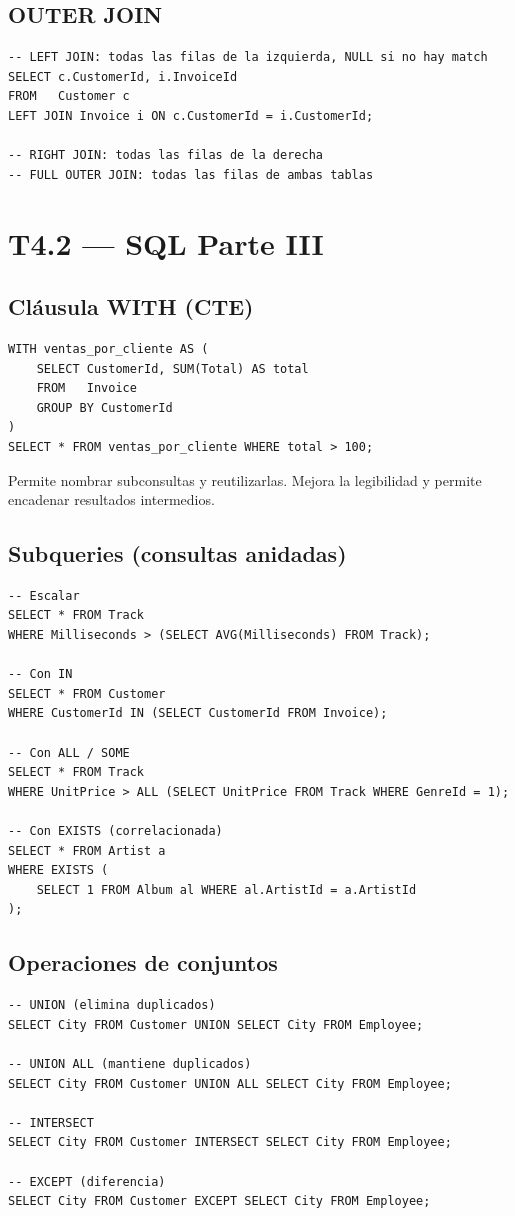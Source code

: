 \documentclass[12pt, a4paper]{article}
\begin{document}
\subsection{OUTER JOIN}
\begin{lstlisting}
-- LEFT JOIN: todas las filas de la izquierda, NULL si no hay match
SELECT c.CustomerId, i.InvoiceId
FROM   Customer c
LEFT JOIN Invoice i ON c.CustomerId = i.CustomerId;

-- RIGHT JOIN: todas las filas de la derecha
-- FULL OUTER JOIN: todas las filas de ambas tablas
\end{lstlisting}

\section{T4.2 — SQL Parte III}

\subsection{Cláusula WITH (CTE)}
\begin{lstlisting}
WITH ventas_por_cliente AS (
    SELECT CustomerId, SUM(Total) AS total
    FROM   Invoice
    GROUP BY CustomerId
)
SELECT * FROM ventas_por_cliente WHERE total > 100;
\end{lstlisting}
Permite nombrar subconsultas y reutilizarlas. Mejora la legibilidad y permite encadenar resultados intermedios.

\subsection{Subqueries (consultas anidadas)}
\begin{lstlisting}
-- Escalar
SELECT * FROM Track
WHERE Milliseconds > (SELECT AVG(Milliseconds) FROM Track);

-- Con IN
SELECT * FROM Customer
WHERE CustomerId IN (SELECT CustomerId FROM Invoice);

-- Con ALL / SOME
SELECT * FROM Track
WHERE UnitPrice > ALL (SELECT UnitPrice FROM Track WHERE GenreId = 1);

-- Con EXISTS (correlacionada)
SELECT * FROM Artist a
WHERE EXISTS (
    SELECT 1 FROM Album al WHERE al.ArtistId = a.ArtistId
);
\end{lstlisting}

\subsection{Operaciones de conjuntos}
\begin{lstlisting}
-- UNION (elimina duplicados)
SELECT City FROM Customer UNION SELECT City FROM Employee;

-- UNION ALL (mantiene duplicados)
SELECT City FROM Customer UNION ALL SELECT City FROM Employee;

-- INTERSECT
SELECT City FROM Customer INTERSECT SELECT City FROM Employee;

-- EXCEPT (diferencia)
SELECT City FROM Customer EXCEPT SELECT City FROM Employee;
\end{lstlisting}
\end{document}
